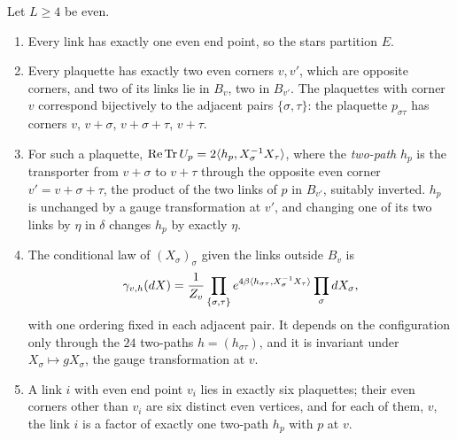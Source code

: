 \begin{lemma}\label{lem:stars}
Let $L\ge4$ be even.
\begin{enumerate}[label=\textup{(\roman*)},leftmargin=*]
\item Every link has exactly one even end point, so the stars partition $E$.
\item Every plaquette has exactly two even corners $v,v'$, which are opposite
corners, and two of its links lie in $B_v$, two in $B_{v'}$. The plaquettes
with corner $v$ correspond bijectively to the adjacent pairs $\{\sigma,\tau\}$:
the plaquette $p_{\sigma\tau}$ has corners $v$, $v+\sigma$, $v+\sigma+\tau$,
$v+\tau$.
\item For such a plaquette, $\operatorname{Re}\operatorname{Tr} U_p=2\langle h_p,X_\sigma^{-1}X_\tau\rangle$, where
the \emph{two-path} $h_p$ is the transporter from $v+\sigma$ to $v+\tau$
through the opposite even corner $v'=v+\sigma+\tau$, the product of the two
links of $p$ in $B_{v'}$, suitably inverted. $h_p$ is unchanged by a gauge
transformation at $v'$, and changing one of its two links by $\eta$ in
$\delta$ changes $h_p$ by exactly $\eta$.
\item The conditional law of $(X_\sigma)_\sigma$ given the links outside $B_v$ is
\[
\gamma_{v,h}(dX)=\frac1{Z_v}\prod_{\{\sigma,\tau\}}e^{4\beta\langle h_{\sigma\tau},X_\sigma^{-1}X_\tau\rangle}\prod_\sigma dX_\sigma ,
\]
with one ordering fixed in each adjacent pair. It depends on the
configuration only through the $24$ two-paths $h=(h_{\sigma\tau})$, and it is
invariant under $X_\sigma\mapsto gX_\sigma$, the gauge transformation at $v$.
\item A link $i$ with even end point $v_i$ lies in exactly six plaquettes;
their even corners other than $v_i$ are six distinct even vertices, and for
each of them, $v$, the link $i$ is a factor of exactly one two-path $h_p$ with
$p$ at $v$.
\end{enumerate}
\end{lemma}

